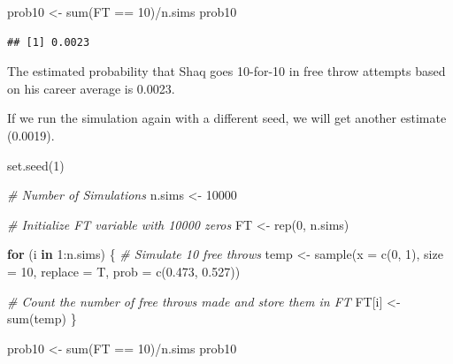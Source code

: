 \documentclass[
  11pt,
]{book}
\newenvironment{Shaded}{\begin{snugshade}}{\end{snugshade}}
\newcommand{\AttributeTok}[1]{\textcolor[rgb]{0.77,0.63,0.00}{#1}}
\newcommand{\CommentTok}[1]{\textcolor[rgb]{0.56,0.35,0.01}{\textit{#1}}}
\newcommand{\ControlFlowTok}[1]{\textcolor[rgb]{0.13,0.29,0.53}{\textbf{#1}}}
\newcommand{\DecValTok}[1]{\textcolor[rgb]{0.00,0.00,0.81}{#1}}
\newcommand{\FloatTok}[1]{\textcolor[rgb]{0.00,0.00,0.81}{#1}}
\newcommand{\FunctionTok}[1]{\textcolor[rgb]{0.00,0.00,0.00}{#1}}
\newcommand{\NormalTok}[1]{#1}
\newcommand{\OtherTok}[1]{\textcolor[rgb]{0.56,0.35,0.01}{#1}}
\newcommand{\SpecialCharTok}[1]{\textcolor[rgb]{0.00,0.00,0.00}{#1}}
\theoremstyle{definition}
\theoremstyle{definition}
\theoremstyle{definition}
\theoremstyle{definition}
\theoremstyle{remark}
\begin{document}
\begin{Shaded}
\begin{Highlighting}[]
\NormalTok{prob10 }\OtherTok{\textless{}{-}} \FunctionTok{sum}\NormalTok{(FT }\SpecialCharTok{==} \DecValTok{10}\NormalTok{)}\SpecialCharTok{/}\NormalTok{n.sims}
\NormalTok{prob10}
\end{Highlighting}
\end{Shaded}

\begin{verbatim}
## [1] 0.0023
\end{verbatim}

The estimated probability that Shaq goes 10-for-10 in free throw attempts based on his career average is 0.0023.

If we run the simulation again with a different seed, we will get another estimate (0.0019).

\begin{Shaded}
\begin{Highlighting}[]
\FunctionTok{set.seed}\NormalTok{(}\DecValTok{1}\NormalTok{)}

\CommentTok{\# Number of Simulations}
\NormalTok{n.sims }\OtherTok{\textless{}{-}} \DecValTok{10000}

\CommentTok{\# Initialize FT variable with 10000 zeros}
\NormalTok{FT }\OtherTok{\textless{}{-}} \FunctionTok{rep}\NormalTok{(}\DecValTok{0}\NormalTok{, n.sims)}

\ControlFlowTok{for}\NormalTok{ (i }\ControlFlowTok{in} \DecValTok{1}\SpecialCharTok{:}\NormalTok{n.sims) \{}
    \CommentTok{\# Simulate 10 free throws}
\NormalTok{    temp }\OtherTok{\textless{}{-}} \FunctionTok{sample}\NormalTok{(}\AttributeTok{x =} \FunctionTok{c}\NormalTok{(}\DecValTok{0}\NormalTok{, }\DecValTok{1}\NormalTok{), }\AttributeTok{size =} \DecValTok{10}\NormalTok{, }\AttributeTok{replace =}\NormalTok{ T, }\AttributeTok{prob =} \FunctionTok{c}\NormalTok{(}\FloatTok{0.473}\NormalTok{, }\FloatTok{0.527}\NormalTok{))}

    \CommentTok{\# Count the number of free throws made and store them in FT}
\NormalTok{    FT[i] }\OtherTok{\textless{}{-}} \FunctionTok{sum}\NormalTok{(temp)}
\NormalTok{\}}

\NormalTok{prob10 }\OtherTok{\textless{}{-}} \FunctionTok{sum}\NormalTok{(FT }\SpecialCharTok{==} \DecValTok{10}\NormalTok{)}\SpecialCharTok{/}\NormalTok{n.sims}
\NormalTok{prob10}
\end{Highlighting}
\end{Shaded}
\end{document}
